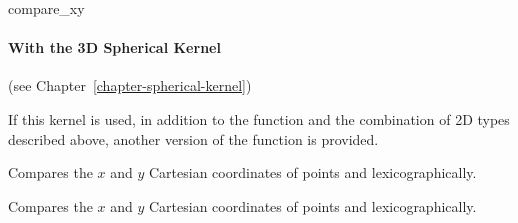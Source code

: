 \begin{ccRefFunction}{compare_xy}
\paragraph{With the 3D Spherical Kernel} (see Chapter~\ref{chapter-spherical-kernel}) 


If this kernel is used, in addition to the function and the
combination of 2D types described above, another version of the function
is provided.

{Compares the $x$ and $y$ Cartesian coordinates of points  and
        lexicographically.}

{Compares the $x$ and $y$ Cartesian coordinates of points  and
        lexicographically.}


\ccSeeAlso
{} \\
 \\
 \\
 \\
 \\
 \\
 \\

\end{ccRefFunction}


